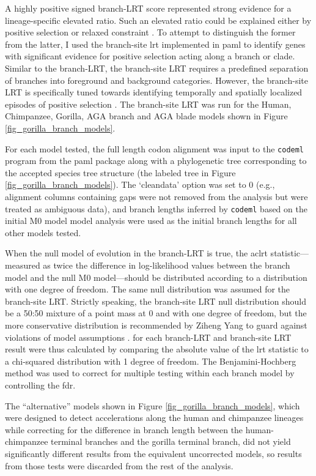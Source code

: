 A highly positive signed branch-LRT score represented strong evidence
for a lineage-specific elevated \dnds ratio. Such an elevated ratio
could be explained either by positive selection or relaxed constraint
\citep{Nielsen2005,Sequencing2005a}. To attempt to distinguish the
former from the latter, I used the branch-site \ac{lrt} implemented in
\ac{paml} \citep{Zhang2005} to identify genes with significant
evidence for positive selection acting along a branch or
clade. Similar to the branch-LRT, the branch-site LRT requires a
predefined separation of branches into foreground and background
categories. However, the branch-site LRT is specifically tuned towards
identifying temporally and spatially localized episodes of positive
selection \citep{Nielsen1998,Yang2002b,Zhang2005}. The branch-site LRT
was run for the Human, Chimpanzee, Gorilla, AGA branch and AGA blade
models shown in Figure \ref{fig_gorilla_branch_models}.

For each model tested, the full length codon alignment was input to
the \texttt{codeml} program from the \ac{paml} package along with a
phylogenetic tree corresponding to the accepted species tree structure
(the labeled tree in Figure \ref{fig_gorilla_branch_models}). The
`cleandata’ option was set to 0 (e.g., alignment columns containing
gaps were not removed from the analysis but were treated as ambiguous
data), and branch lengths inferred by \texttt{codeml} based on the
initial M0 model model analysis were used as the initial branch
lengths for all other models tested.

When the null model of evolution in the branch-LRT is true, the
ac{lrt} statistic---measured as twice the difference in log-likelihood
values between the branch model and the null M0 model---should be
distributed according to a \chisq distribution with one degree of
freedom. The same null distribution was assumed for the branch-site
LRT. Strictly speaking, the branch-site LRT null distribution should
be a 50:50 mixture of a point mass at 0 and \chisq with one degree of
freedom, but the more conservative \chisq distribution is recommended
by Ziheng Yang to guard against violations of model assumptions
\citep{Yang2007}. \pvs for each branch-LRT and branch-site LRT result
were thus calculated by comparing the absolute value of the \ac{lrt}
statistic to a chi-squared distribution with 1 degree of freedom. The
Benjamini-Hochberg method \citep{Benjamini1995} was used to correct
for multiple testing within each branch model by controlling the
\ac{fdr}.

The ``alternative'' models shown in Figure
\ref{fig_gorilla_branch_models}, which were designed to detect
accelerations along the human and chimpanzee lineages while correcting
for the difference in branch length between the human-chimpanzee
terminal branches and the gorilla terminal branch, did not yield
significantly different results from the equivalent uncorrected
models, so results from those tests were discarded from the rest of
the analysis.

